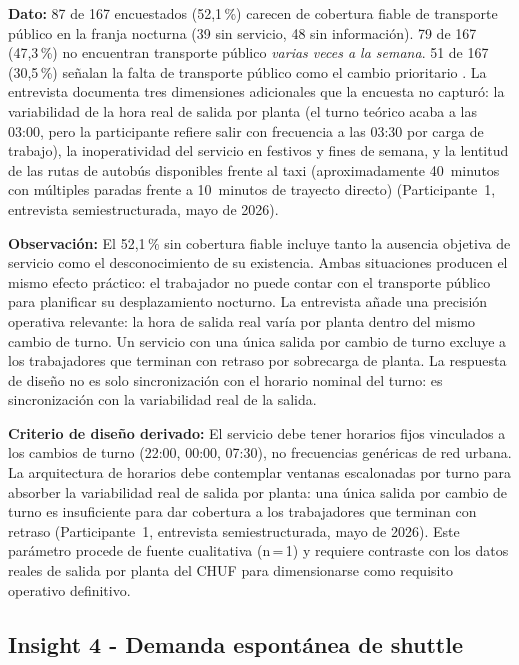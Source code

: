 \textbf{Dato:} 87 de 167 encuestados (52{,}1\,\%) carecen de
cobertura fiable de transporte público en la franja nocturna
(39 sin servicio, 48 sin información). 79 de 167 (47{,}3\,\%)
no encuentran transporte público \emph{varias veces a la semana}.
51 de 167 (30{,}5\,\%) señalan la falta de transporte público
como el cambio prioritario \parencite{LouridoRegueira2026}. La
entrevista documenta tres dimensiones adicionales que la encuesta
no capturó: la variabilidad de la hora real de salida por planta
(el turno teórico acaba a las 03:00, pero la participante refiere
salir con frecuencia a las 03:30 por carga de trabajo), la
inoperatividad del servicio en festivos y fines de semana, y la
lentitud de las rutas de autobús disponibles frente al taxi
(aproximadamente 40~minutos con múltiples paradas frente a
10~minutos de trayecto directo) (Participante~1, entrevista
semiestructurada, mayo de 2026).

\textbf{Observación:} El 52{,}1\,\% sin cobertura fiable incluye
tanto la ausencia objetiva de servicio como el desconocimiento
de su existencia. Ambas situaciones producen el mismo efecto
práctico: el trabajador no puede contar con el transporte público
para planificar su desplazamiento nocturno. La entrevista añade
una precisión operativa relevante: la hora de salida real varía
por planta dentro del mismo cambio de turno. Un servicio con una
única salida por cambio de turno excluye a los trabajadores que
terminan con retraso por sobrecarga de planta. La respuesta de
diseño no es solo sincronización con el horario nominal del turno:
es sincronización con la variabilidad real de la salida.

\textbf{Criterio de diseño derivado:} El servicio debe tener
horarios fijos vinculados a los cambios de turno (22:00, 00:00,
07:30), no frecuencias genéricas de red urbana. La arquitectura
de horarios debe contemplar ventanas escalonadas por turno para
absorber la variabilidad real de salida por planta: una única
salida por cambio de turno es insuficiente para dar cobertura a
los trabajadores que terminan con retraso (Participante~1,
entrevista semiestructurada, mayo de 2026). Este parámetro
procede de fuente cualitativa (n\,=\,1) y requiere contraste con
los datos reales de salida por planta del \acs{CHUF} para
dimensionarse como requisito operativo definitivo.


\subsection*{Insight 4 - Demanda espontánea de shuttle}
\label{sec:insight-4}

